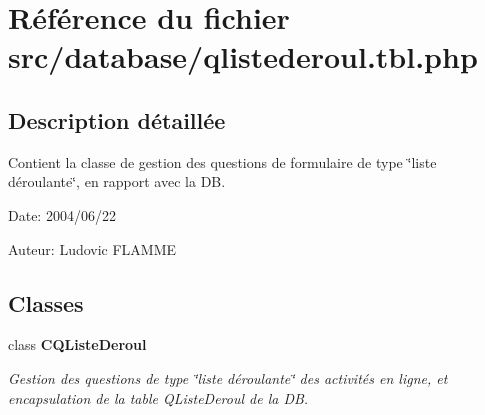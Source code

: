 \section{Référence du fichier src/database/qlistederoul.tbl.php}
\label{qlistederoul_8tbl_8php}


\subsection{Description détaillée}
Contient la classe de gestion des questions de formulaire de type \char`\"{}liste déroulante\char`\"{}, en rapport avec la DB. 

\begin{Desc}
\item[Date:]2004/06/22\end{Desc}
\begin{Desc}
\item[Auteur:]Ludovic FLAMME \end{Desc}


\subsection*{Classes}
\begin{CompactItemize}
\item 
class {\bf CQListeDeroul}
\begin{CompactList}\small\item\em Gestion des questions de type \char`\"{}liste déroulante\char`\"{} des activités en ligne, et encapsulation de la table QListeDeroul de la DB. \item\end{CompactList}\end{CompactItemize}
